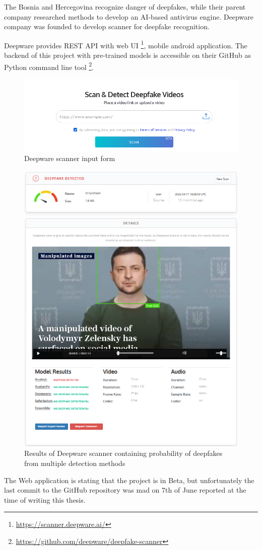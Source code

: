 The Bosnia and Hercegovina recognize danger of deepfakes, while their parent company researched methods to develop an AI-based antivirus engine. Deepware company was founded to develop scanner for deepfake recognition.

Deepware provides REST API with web UI \footnote{\url{https://scanner.deepware.ai/}}, mobile android application. The backend of this project with pre-trained models is accessible on their GitHub as Python command line tool \footnote{\url{ https://github.com/deepware/deepfake-scanner}}.

\begin{figure}[H]
    \centering
    \includegraphics[width=.65\linewidth]{other-fig/deepware_input.png}        
    \caption{Deepware scanner input form}
    \label{fig:deepware_input}
\end{figure}

\begin{figure}[H]
    \centering
    \includegraphics[width=.58\linewidth]{other-fig/deepware_results.png}        
    \caption{Results of Deepware scanner containing probability of deepfakes from multiple detection methods}
    \label{fig:deepware_results}
\end{figure}

The Web application is stating that the project is in Beta, but unfortunately the last commit to the GitHub repository was mad on 7th of June reported at the time of writing this thesis.

